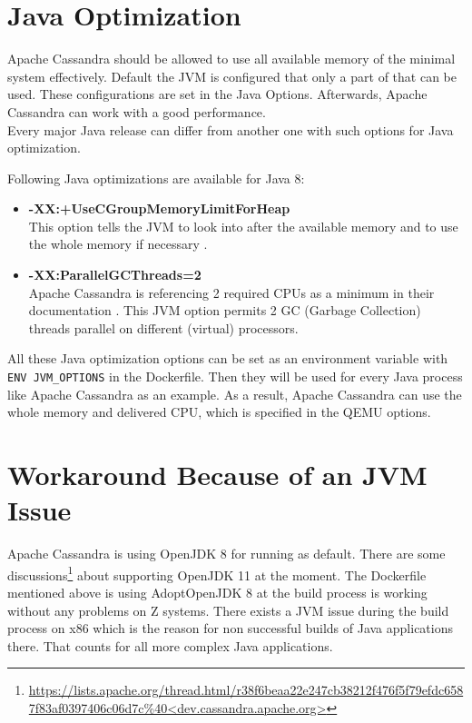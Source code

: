 \section{Java Optimization}

Apache Cassandra should be allowed to use all available memory of the minimal system effectively.
Default the JVM is configured that only a part of that can be used. These configurations are set in the Java Options.
Afterwards, Apache Cassandra can work with a good performance. \\
Every major Java release can differ from another one with such options for Java optimization.

Following Java optimizations are available for Java 8: \\
\begin{itemize}
\item \textbf{-XX:+UseCGroupMemoryLimitForHeap}  \\
This option tells the JVM to look into  after the available memory and to use the whole memory if necessary \cite{Flood2017}.
\item \textbf{-XX:ParallelGCThreads=2} \\
Apache Cassandra is referencing  2 required CPUs as a minimum in their documentation \cite{Cassandra}.
This JVM option permits 2 GC (Garbage Collection) threads parallel on different (virtual) processors.
\end{itemize}

All these Java optimization options can be set as an environment variable with \lstinline!ENV JVM_OPTIONS! in the Dockerfile. Then they will be used for every Java process like Apache Cassandra as an example.
As a result, Apache Cassandra can use the whole memory and delivered CPU, which is specified in the QEMU options.


\section{Workaround Because of an JVM Issue}

Apache Cassandra is using OpenJDK 8 for running as default. There are some discussions\footnote{\url{https://lists.apache.org/thread.html/r38f6beaa22e247cb38212f476f5f79efdc6587f83af0397406c06d7c\%40<dev.cassandra.apache.org>}} about supporting OpenJDK 11 at the moment. The Dockerfile mentioned above is using AdoptOpenJDK 8 at the build process is working without any problems on Z systems. There exists a JVM issue during the build process on x86 which is the reason for non successful builds of Java applications there. That counts for all more complex Java applications.

